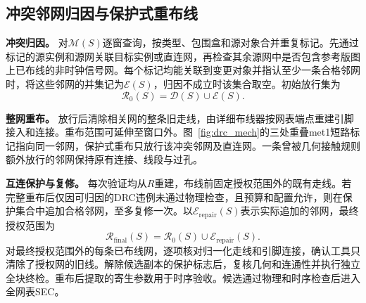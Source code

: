 \documentclass[twocolumn,10pt,fontset=windows]{ctexart}
\begin{document}
\subsection{冲突邻网归因与保护式重布线}
\label{sec:protected}

\textbf{冲突归因。} 对$\mathcal M(S)$逐窗查询，按类型、包围盒和源对象合并重复标记。先通过标记的源实例和源网关联目标实例或直连网，再检查其余源网中是否包含参考版图上已布线的非时钟信号网。每个标记均能关联到变更对象并指认至少一条合格邻网时，将这些邻网的并集记为$\mathcal E(S)$，归因不成立时该集合取空。初始放行集为
\[
\mathcal R_0(S)=\mathcal D(S)\cup\mathcal E(S).
\]

\textbf{整网重布。} 放行后清除相关网的整条旧走线，由详细布线器按网表端点重建引脚接入和连接。重布范围可延伸至窗口外。图~\ref{fig:drc_mech}的三处重叠met1短路标记指向同一邻网，保护式重布只放行该冲突邻网及直连网。一条曾被几何接触规则额外放行的邻网保持原有连接、线段与过孔。

\textbf{互连保护与复修。} 每次验证均从$R$重建，布线前固定授权范围外的既有走线。若完整重布后仅因可归因的DRC违例未通过物理检查，且预算和配置允许，则在保护集合中追加合格邻网，至多复修一次。以$\mathcal E_{\mathrm{repair}}(S)$表示实际追加的邻网，最终授权范围为
\[
\mathcal R_{\mathrm{final}}(S)=\mathcal R_0(S)\cup\mathcal E_{\mathrm{repair}}(S).
\]
对最终授权范围外的每条已布线网，逐项核对归一化走线和引脚连接，确认工具只清除了授权网的旧线。解除候选副本的保护标志后，复核几何和连通性并执行独立全块终检。重布后提取的寄生参数用于时序验收。候选通过物理和时序检查后进入全网表SEC。
\end{document}

